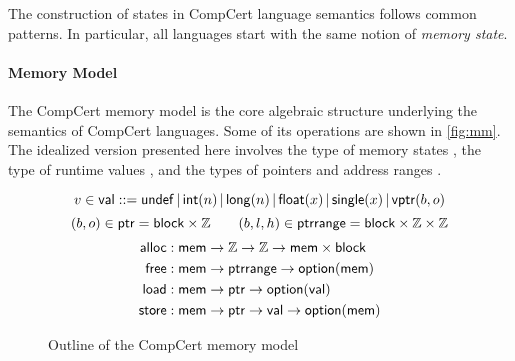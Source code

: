 \documentclass[sigplan,screen]{acmart}
\newcommand{\figsize}{\small}
\begin{document}
The construction of states in CompCert language semantics
follows common patterns.
In particular,
all languages start with
the same notion of \emph{memory state}.


\paragraph{Memory Model} \label{sec:sem:mm} %

The CompCert memory model \cite{compcertmm,compcertmmv2}
is the core algebraic structure
underlying the semantics of CompCert languages.
Some of its operations
are shown in \autoref{fig:mm}.
The idealized version presented here
involves
the type of memory states ,
the type of runtime values , and
the types of pointers  and address ranges .

\begin{figure} %
  \figsize
  \[
    v \in  \mathsf{val}  ::=
           \mathsf{undef}  \,|\,
           \mathsf{int} (n) \,|\,
           \mathsf{long} (n) \,|\,
           \mathsf{float} (x) \,|\,
           \mathsf{single} (x) \,|\,
           \mathsf{vptr} (b, o)
  \]
  \[
    (b, o) \in  \mathsf{ptr}  =
       \mathsf{block}  \times \mathbb{Z}
    \qquad
    (b, l, h) \in  \mathsf{ptrrange}  =
       \mathsf{block}  \times \mathbb{Z} \times \mathbb{Z}
  \]
  \begin{align*}
     \mathsf{alloc}  &:
       \mathsf{mem}  \rightarrow \mathbb{Z} \rightarrow \mathbb{Z} \rightarrow
       \mathsf{mem}  \times  \mathsf{block} 
    \\
     \mathsf{free}  &:
       \mathsf{mem}  \rightarrow
       \mathsf{ptrrange}  \rightarrow
       \mathsf{option} ( \mathsf{mem} )
    \\
     \mathsf{load}  &:
       \mathsf{mem}  \rightarrow  \mathsf{ptr}  \rightarrow  \mathsf{option} ( \mathsf{val} )
    \\
     \mathsf{store}  &:
       \mathsf{mem}  \rightarrow  \mathsf{ptr}  \rightarrow  \mathsf{val}  \rightarrow  \mathsf{option} ( \mathsf{mem} )
  \end{align*}
  \caption{Outline of the CompCert memory model}
  \label{fig:mm}
\end{figure}
\end{document}

